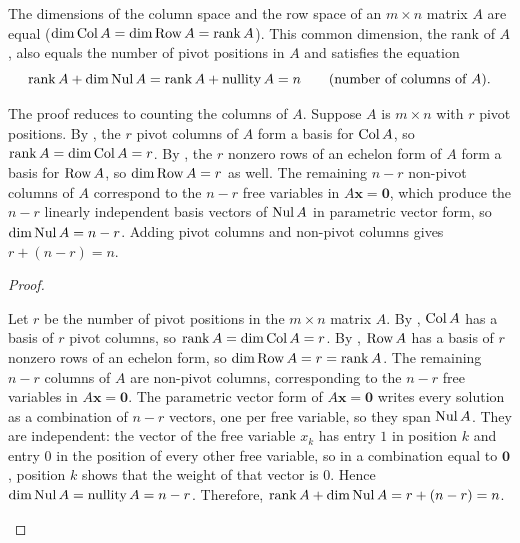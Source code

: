 \documentclass[10pt]{scrartcl}
\newcommand{\vv}[1]{\mathbf{#1}}
\begin{document}
\begin{theorem*}
  The dimensions of the column space and the row space of an $m\times n$ matrix $A$ are equal ($\dim\operatorname{Col} A=\dim\operatorname{Row} A=\operatorname{rank}A$). This common dimension, the rank of $A$, also equals the number of pivot positions in $A$ and satisfies the equation
  \[
    \operatorname{rank}A + \dim\operatorname{Nul} A = \operatorname{rank}A + \operatorname{nullity} A = n \qquad (\text{number of columns of }A).
  \]
\end{theorem*}
\begin{ideabox}
  The proof reduces to counting the columns of $A$. Suppose $A$ is $m\times n$ with $r$ pivot positions. By , the $r$ pivot columns of $A$ form a basis for $\operatorname{Col} A$, so $\operatorname{rank}A=\dim\operatorname{Col} A=r$. By , the $r$ nonzero rows of an echelon form of $A$ form a basis for $\operatorname{Row} A$, so $\dim\operatorname{Row} A=r$ as well. The remaining $n-r$ non-pivot columns of $A$ correspond to the $n-r$ free variables in $A\vv x=\vv 0$, which produce the $n-r$ linearly independent basis vectors of $\operatorname{Nul} A$ in parametric vector form, so $\dim\operatorname{Nul} A=n-r$. Adding pivot columns and non-pivot columns gives $r+(n-r)=n$.
\end{ideabox}
\begin{proof}
  \begin{steps}
    \ii Let $r$ be the number of pivot positions in the $m\times n$ matrix $A$. By , $\operatorname{Col} A$ has a basis of $r$ pivot columns, so $\operatorname{rank}A=\dim\operatorname{Col} A=r$. By , $\operatorname{Row} A$ has a basis of $r$ nonzero rows of an echelon form, so $\dim\operatorname{Row} A=r=\operatorname{rank}A$.
    \ii The remaining $n-r$ columns of $A$ are non-pivot columns, corresponding to the $n-r$ free variables in $A\vv x=\vv 0$. The parametric vector form of $A\vv x=\vv 0$ writes every solution as a combination of $n-r$ vectors, one per free variable, so they span $\operatorname{Nul} A$. They are independent: the vector of the free variable $x_k$ has entry $1$ in position $k$ and entry $0$ in the position of every other free variable, so in a combination equal to $\vv 0$, position $k$ shows that the weight of that vector is $0$. Hence $\dim\operatorname{Nul} A=\operatorname{nullity} A=n-r$.
    \ii Therefore, $\operatorname{rank}A+\dim\operatorname{Nul} A=r+(n-r)=n$.
  \end{steps}
\end{proof}
\end{document}

